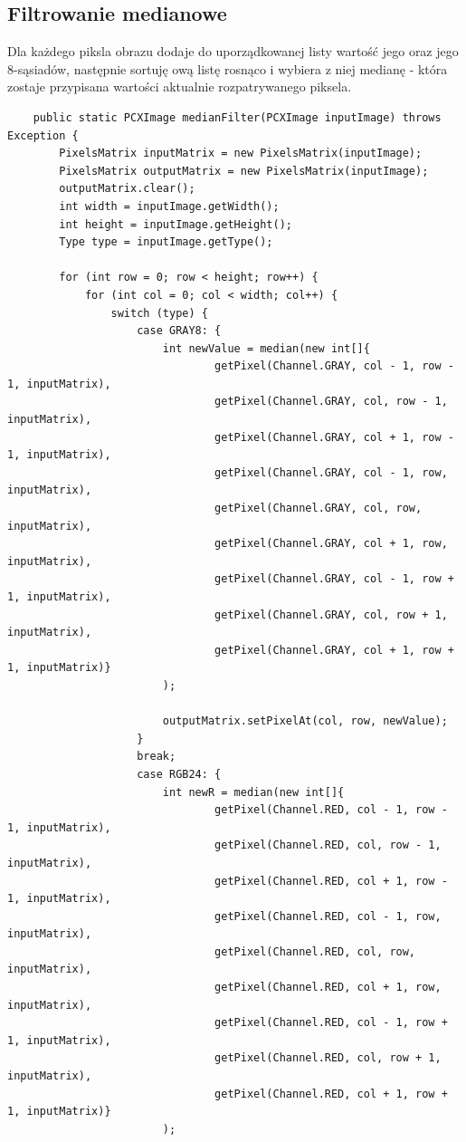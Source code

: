 \documentclass{article}
\begin{document}
	\subsection{Filtrowanie medianowe}
	Dla każdego piksla obrazu dodaje do uporządkowanej listy wartość jego oraz jego 8-sąsiadów, następnie sortuję ową listę rosnąco i wybiera z niej medianę - która zostaje przypisana wartości aktualnie rozpatrywanego piksela.
	\begin{verbatim}
	public static PCXImage medianFilter(PCXImage inputImage) throws Exception {
        PixelsMatrix inputMatrix = new PixelsMatrix(inputImage);
        PixelsMatrix outputMatrix = new PixelsMatrix(inputImage);
        outputMatrix.clear();
        int width = inputImage.getWidth();
        int height = inputImage.getHeight();
        Type type = inputImage.getType();

        for (int row = 0; row < height; row++) {
            for (int col = 0; col < width; col++) {
                switch (type) {
                    case GRAY8: {
                        int newValue = median(new int[]{
                                getPixel(Channel.GRAY, col - 1, row - 1, inputMatrix),
                                getPixel(Channel.GRAY, col, row - 1, inputMatrix),
                                getPixel(Channel.GRAY, col + 1, row - 1, inputMatrix),
                                getPixel(Channel.GRAY, col - 1, row, inputMatrix),
                                getPixel(Channel.GRAY, col, row, inputMatrix),
                                getPixel(Channel.GRAY, col + 1, row, inputMatrix),
                                getPixel(Channel.GRAY, col - 1, row + 1, inputMatrix),
                                getPixel(Channel.GRAY, col, row + 1, inputMatrix),
                                getPixel(Channel.GRAY, col + 1, row + 1, inputMatrix)}
                        );
                        
                        outputMatrix.setPixelAt(col, row, newValue);
                    }
                    break;
                    case RGB24: {
                        int newR = median(new int[]{
                                getPixel(Channel.RED, col - 1, row - 1, inputMatrix),
                                getPixel(Channel.RED, col, row - 1, inputMatrix),
                                getPixel(Channel.RED, col + 1, row - 1, inputMatrix),
                                getPixel(Channel.RED, col - 1, row, inputMatrix),
                                getPixel(Channel.RED, col, row, inputMatrix),
                                getPixel(Channel.RED, col + 1, row, inputMatrix),
                                getPixel(Channel.RED, col - 1, row + 1, inputMatrix),
                                getPixel(Channel.RED, col, row + 1, inputMatrix),
                                getPixel(Channel.RED, col + 1, row + 1, inputMatrix)}
                        );
                        

\end{verbatim}
\end{document}
